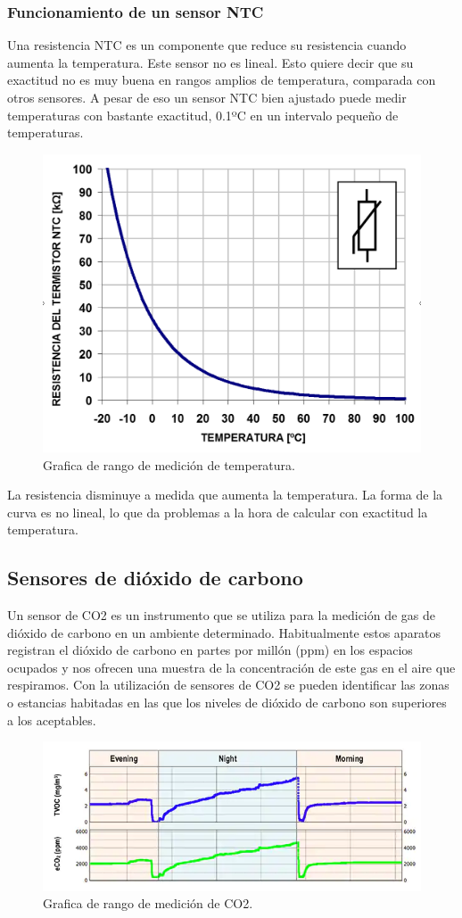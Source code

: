 \documentclass[12pt]{book}
\begin{document}
\subsubsection{Funcionamiento de un sensor NTC}

Una resistencia NTC es un componente que reduce su resistencia cuando aumenta la temperatura. Este sensor no es lineal. Esto quiere decir que su exactitud no es muy buena en rangos amplios de temperatura, comparada con otros sensores. A pesar de eso un sensor NTC bien ajustado puede medir temperaturas con bastante exactitud, 0.1ºC en un intervalo pequeño de temperaturas. \\
 \begin{figure}[h]
 	\centering
 	\includegraphics[width=0.4\linewidth]{imagenes/temperatura}
 	\caption[Grafica de rango de medición de temperatura]{Grafica de rango de medición de temperatura.}
 	\label{fig:temperatura}
 \end{figure}

 La resistencia disminuye a medida que aumenta la temperatura. La forma de la curva es no lineal, lo que da problemas a la hora de calcular con exactitud la temperatura.
 \subsection{Sensores de dióxido de carbono}
 
 Un sensor de CO2 es un instrumento que se utiliza para la medición de gas de dióxido de carbono en un ambiente determinado. Habitualmente estos aparatos registran el dióxido de carbono en partes por millón (ppm) en los espacios ocupados y nos ofrecen una muestra de la concentración de este gas en el aire que respiramos. Con la utilización de sensores de CO2 se pueden identificar las zonas o estancias habitadas en las que los niveles de dióxido de carbono son superiores a los aceptables. \\
 
 \begin{figure}[h]
 	\centering
 	\includegraphics[width=0.6\linewidth]{imagenes/co2}
 	\caption[Grafica de rango de medición de CO2]{Grafica de rango de medición de CO2.}
 	\label{fig:co2}
 \end{figure}
\end{document}
